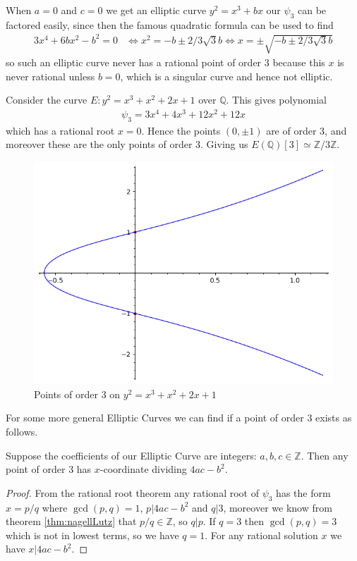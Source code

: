 \begin{example}
  When $a = 0$ and $c = 0$
  we get an elliptic curve $y^2 = x^3 + bx$
  our $\psi_3$ can be factored easily, since then
  the famous quadratic formula can be used to find
  \begin{align*}
    3x^4 + 6bx^2 - b^2 = 0 &\iff
    x^2 = -b \pm 2/3 \sqrt{3} b
    \iff
    x = \pm \sqrt{-b \pm 2/3 \sqrt{3} b}
  \end{align*}
  so such an elliptic curve never has
  a rational point of order 3 because this $x$ is never rational unless
  $b = 0$, which is a singular curve and hence not elliptic.
\end{example}
\begin{example}
  Consider the curve $E: y^2 = x^3 + x^2 + 2x + 1$ over $\mathbb{Q}$.
  This gives polynomial
  \begin{align*}
    \psi_3 = 3x^4 + 4x^3 + 12x^2 + 12x
  \end{align*}
  which has a rational root $x = 0$.
  Hence the points $(0, \pm 1)$ are of order 3, and moreover these
  are the only points of order 3. Giving us $E(\mathbb{Q})[3] \simeq \mathbb{Z}/3\mathbb{Z}$.
  \begin{figure}[H]
    \centering
    \includegraphics[width=0.4\linewidth]{pointsOfFiniteOrder/examplePointsOrder3.png}
    \caption{Points of order 3 on $y^2 = x^3 + x^2 + 2x + 1$ }%
    \label{fig:pointsOfFiniteOrder/examplePointsOrder3}
  \end{figure}
\end{example}
For some more general Elliptic Curves we can find if a point of order 3 exists as follows.
\begin{corollary}
  Suppose the coefficients of our Elliptic Curve are integers: $a, b, c \in \mathbb{Z}$.
  Then any point of order 3 has $x$-coordinate dividing $4ac - b^2$.
\end{corollary}
\begin{proof}
  From the rational root theorem \cite[Section 9.4]{dummiteAndFooteAbstractAlgebra}
  any rational root of $\psi_3$ has the form $x = p/q$ where $\gcd(p, q) = 1$, $p | 4ac - b^2$ and $q|3$,
  moreover we know from theorem \ref{thm:nagellLutz}
  that $p/q \in \mathbb{Z}$, so $q | p$. If $q = 3$ then $\gcd(p, q) = 3$
  which is not in lowest terms, so we have $q = 1$.
  For any rational solution $x$ we have $x|4ac - b^2$.
\end{proof}
